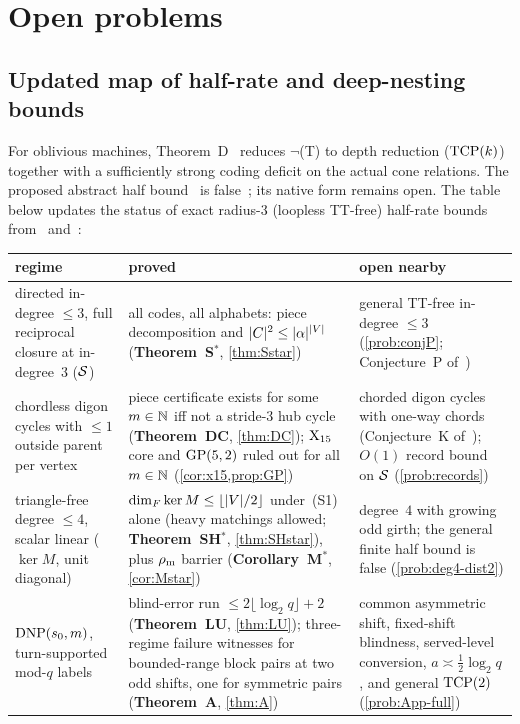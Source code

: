 \section{Open problems}\label{sec:open}

\subsection{Updated map of half-rate and deep-nesting bounds}

For oblivious machines, Theorem~D~\cite[Section~4.2, Theorem~4.10]{FourthPaper2026} reduces $\neg$(T) to depth reduction
($\mathrm{TCP}(k)$) together with a sufficiently strong coding deficit on the actual cone relations.
The proposed abstract half bound~\cite[Question~9.1]{DirectedRecovery2026} is false~\cite{StorageCodes2026}; its native
form remains open. The table below updates the status of exact radius-$3$ (loopless TT-free)
half-rate bounds from~\cite[Section~9.1]{SeventhPaper2026} and~\cite[Section~8]{EighthPaper2026}:

\begin{center}
\small
\begin{tabular}{@{}>{\raggedright\arraybackslash}p{}>{\raggedright\arraybackslash}p{}>{\raggedright\arraybackslash}p{}@{}}
\toprule
\textbf{regime} & \textbf{proved} & \textbf{open nearby} \\
\midrule
directed in-degree $\le 3$, full reciprocal closure at in-degree~$3$ ($\mathcal{S}$) &
  all codes, all alphabets: piece decomposition and $\lvert C \rvert^2 \le \lvert \alpha \rvert^{\lvert V \rvert}$ (\textbf{Theorem~S$^*$}, \cref{thm:Sstar}) &
  general TT-free in-degree $\le 3$ (\cref{prob:conjP}; Conjecture~P of~\cite{SeventhPaper2026}) \\
\addlinespace
chordless digon cycles with $\le 1$ outside parent per vertex &
  piece certificate exists for some $m \in \mathbb{N}$ iff not a stride-$3$ hub cycle (\textbf{Theorem~DC}, \cref{thm:DC}); $\mathrm{X}_{15}$ core and $\operatorname{GP}(5,2)$ ruled out for all $m \in \mathbb{N}$ (\cref{cor:x15,prop:GP}) &
  chorded digon cycles with one-way chords (Conjecture~K of~\cite{SeventhPaper2026}); $O(1)$ record bound on $\mathcal{S}$ (\cref{prob:records}) \\
\addlinespace
triangle-free degree $\le 4$, scalar linear ($\ker M$, unit diagonal) &
  $\dim_F \ker M \le \lfloor \lvert V \rvert/2 \rfloor$ under~(S1) alone (heavy matchings allowed; \textbf{Theorem~SH$^*$}, \cref{thm:SHstar}), plus $\rho_{\mathrm{m}}$ barrier (\textbf{Corollary~M$^*$}, \cref{cor:Mstar}) &
  degree~$4$ with growing odd girth; the general finite half bound is false (\cref{prob:deg4-dist2}) \\
\addlinespace
$\mathrm{DNP}(s_0, m)$, turn-supported mod-$q$ labels &
  blind-error run $\le 2\lfloor\log_2 q\rfloor + 2$ (\textbf{Theorem~LU}, \cref{thm:LU}); three-regime failure witnesses for bounded-range block pairs at two odd shifts, one for symmetric pairs (\textbf{Theorem~A}, \cref{thm:A}) &
  common asymmetric shift, fixed-shift blindness, served-level conversion, $a \asymp \tfrac{1}{2}\log_2 q$, and general $\mathrm{TCP}(2)$ (\cref{prob:App-full}) \\
\bottomrule
\end{tabular}
\end{center}

